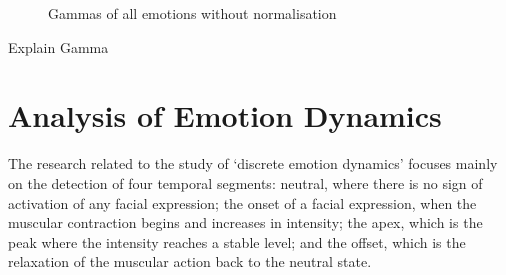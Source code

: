 \documentclass[10pt,journal,cspaper,compsoc]{IEEEtran}
\begin{document}
\begin{figure}[!htp]
\begin{center}
\end{center}
\caption{Gammas of all emotions without normalisation}
\label{fig_without_norm_depen_vs_indepen}
\end{figure}

Explain Gamma

\section{Analysis of Emotion Dynamics}
\label{sec_analysis}
The research related to the study of `discrete emotion dynamics' focuses mainly on the detection of four temporal segments: neutral, where there is no sign of activation of any facial expression; the onset of a facial expression, when the muscular contraction begins and increases in intensity; the apex, which is the peak where the intensity reaches a stable level; and the offset, which is the relaxation of the muscular action back to the neutral state.
\end{document}
